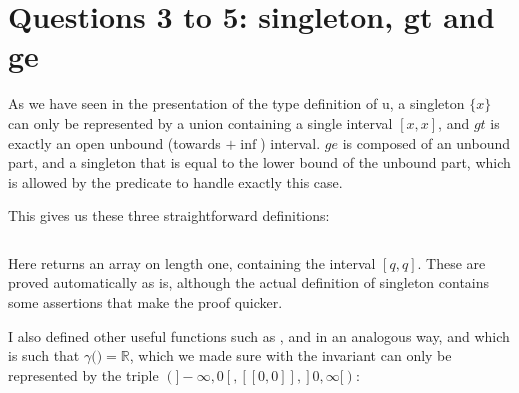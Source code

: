 \section{Questions 3 to 5: singleton, gt and ge}

As we have seen in the presentation of the type definition of u, a singleton $\{x\}$
can only be represented by a union containing a single interval $[x,x]$, and $gt$ is
exactly an open unbound (towards $+\inf$) interval.
%
$ge$ is composed of an unbound
part, and a singleton that is equal to the lower bound of the unbound part, which is
allowed by the  predicate to handle exactly this case.

This gives us these three straightforward definitions:
\inputminted{\whyml}{why3code/simple_ones.mlw}

Here  returns an array on length one, containing the
interval $[q,q]$. These are proved automatically as is, although the actual
definition of singleton contains some assertions that make the proof quicker.

I also defined other useful functions such as ,  and
 in an analogous way, and  which is such that
$\gamma($$) = \mathbb{R}$, which we made sure with the invariant can
only be represented by the triple $(]-\infty, 0[, [[0,0]], ]0,\infty[)$:
\inputminted{\whyml}{why3code/simple_all.mlw}
